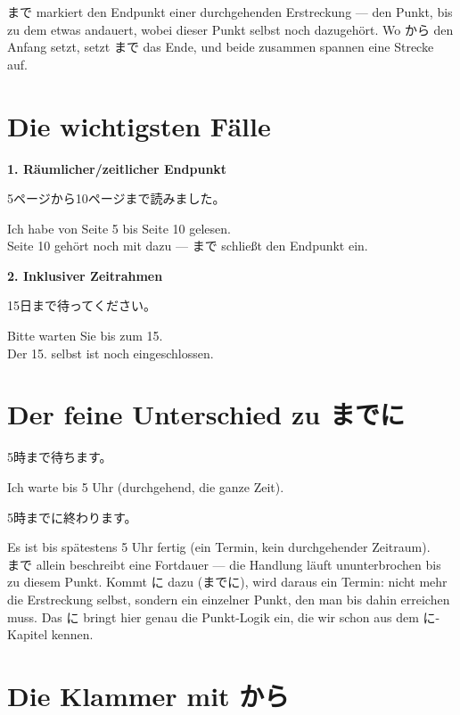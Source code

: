 \documentclass[12pt]{book}
\begin{document}
まで markiert den Endpunkt einer durchgehenden Erstreckung — den Punkt, bis zu dem etwas andauert, wobei dieser Punkt selbst noch dazugehört. Wo から den Anfang setzt, setzt まで das Ende, und beide zusammen spannen eine Strecke auf.

\section*{Die wichtigsten Fälle}

\textbf{1. Räumlicher/zeitlicher Endpunkt}
\par\quad 5ページから10ページまで読みました。\\
\par\quad Ich habe von Seite 5 bis Seite 10 gelesen.\\

Seite 10 gehört noch mit dazu — まで schließt den Endpunkt ein.

\textbf{2. Inklusiver Zeitrahmen}
\par\quad 15日まで待ってください。\\
\par\quad Bitte warten Sie bis zum 15.\\

Der 15. selbst ist noch eingeschlossen.

\section*{Der feine Unterschied zu までに}

\par\quad 5時まで待ちます。\\
\par\quad Ich warte bis 5 Uhr (durchgehend, die ganze Zeit).\\

\par\quad 5時までに終わります。\\
\par\quad Es ist bis spätestens 5 Uhr fertig (ein Termin, kein durchgehender Zeitraum).\\

まで allein beschreibt eine Fortdauer — die Handlung läuft ununterbrochen bis zu diesem Punkt. Kommt に dazu (までに), wird daraus ein Termin: nicht mehr die Erstreckung selbst, sondern ein einzelner Punkt, den man bis dahin erreichen muss. Das に bringt hier genau die Punkt-Logik ein, die wir schon aus dem に-Kapitel kennen.

\section*{Die Klammer mit から}
\end{document}
